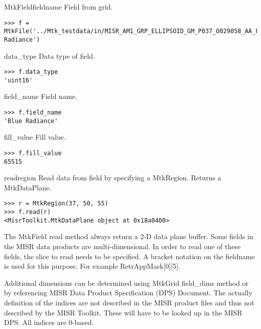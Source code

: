 \documentclass{howto}
\begin{document}
\begin{classdesc*}{MtkField}{fieldname}
  Field from grid.

\begin{verbatim}
>>> f = MtkFile('../Mtk_testdata/in/MISR_AM1_GRP_ELLIPSOID_GM_P037_O029058_AA_F03_0024.hdf').grid('BlueBand').field('Blue Radiance')
\end{verbatim}
\end{classdesc*}

\begin{memberdesc}[char]{data_type}
  Data type of field.

\begin{verbatim}
>>> f.data_type
'uint16'
\end{verbatim}
\end{memberdesc}

\begin{memberdesc}[char]{field_name}
  Field name.

\begin{verbatim}
>>> f.field_name
'Blue Radiance'
\end{verbatim}
\end{memberdesc}

\begin{memberdesc}[]{fill_value}
  Fill value.

\begin{verbatim}
>>> f.fill_value
65515
\end{verbatim}
\end{memberdesc}

\begin{methoddesc}{read}{region}
  Read data from field by specifying a MtkRegion.  Returns a MtkDataPlane.

\begin{verbatim}
>>> r = MtkRegion(37, 50, 55)
>>> f.read(r)
<MisrToolkit.MtkDataPlane object at 0x18a0400>
\end{verbatim}

\begin{notice}[note]
   The MtkField read method always return a 2-D data plane buffer.  Some fields in the MISR data products
   are multi-dimensional.  In order to read one of these fields, the slice to read needs to be specified.
   A bracket notation on the fieldname is used for this purpose.  For example RetrAppMask[0][5].

   Additional dimensions can be determined using MtkGrid field_dims method or by referencing MISR Data
   Product Specification (DPS) Document.  The actually definition of the indices are not described in the
   MISR product files and thus not described by the MISR Toolkit.  These will have to be looked up in the
   MISR DPS.  All indices are 0-based.
\end{notice}

\end{methoddesc}
\end{document}
